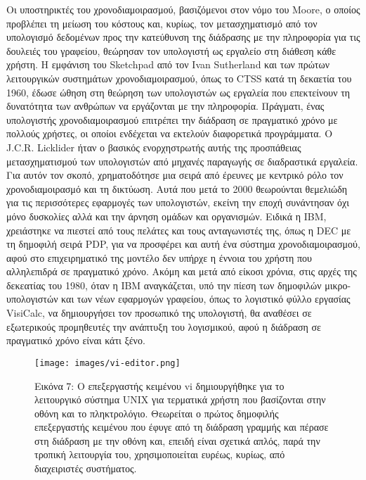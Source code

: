 \documentclass[
]{article}
\begin{document}
Οι υποστηρικτές του χρονοδιαμοιρασμού, βασιζόμενοι στον νόμο του Moore,
ο οποίος προβλέπει τη μείωση του κόστους και, κυρίως, τον μετασχηματισμό
από τον υπολογισμό δεδομένων προς την κατεύθυνση της διάδρασης με την
πληροφορία για τις δουλειές του γραφείου, θεώρησαν τον υπολογιστή ως
εργαλείο στη διάθεση κάθε χρήστη. Η εμφάνιση του Sketchpad από τον Ivan
Sutherland και των πρώτων λειτουργικών συστημάτων χρονοδιαμοιρασμού,
όπως το CTSS κατά τη δεκαετία του 1960, έδωσε ώθηση στη θεώρηση των
υπολογιστών ως εργαλεία που επεκτείνουν τη δυνατότητα των ανθρώπων να
εργάζονται με την πληροφορία. Πράγματι, ένας υπολογιστής
χρονοδιαμοιρασμού επιτρέπει την διάδραση σε πραγματικό χρόνο με πολλούς
χρήστες, οι οποίοι ενδέχεται να εκτελούν διαφορετικά προγράμματα. Ο
J.C.R. Licklider ήταν ο βασικός ενορχηστρωτής αυτής της προσπάθειας
μετασχηματισμού των υπολογιστών από μηχανές παραγωγής σε διαδραστικά
εργαλεία. Για αυτόν τον σκοπό, χρηματοδότησε μια σειρά από έρευνες με
κεντρικό ρόλο τον χρονοδιαμοιρασμό και τη δικτύωση. Αυτά που μετά το
2000 θεωρούνται θεμελιώδη για τις περισσότερες εφαρμογές των
υπολογιστών, εκείνη την εποχή συνάντησαν όχι μόνο δυσκολίες αλλά και την
άρνηση ομάδων και οργανισμών. Ειδικά η IBM, χρειάστηκε να πιεστεί από
τους πελάτες και τους ανταγωνιστές της, όπως η DEC με τη δημοφιλή σειρά
PDP, για να προσφέρει και αυτή ένα σύστημα χρονοδιαμοιρασμού, αφού στο
επιχειρηματικό της μοντέλο δεν υπήρχε η έννοια του χρήστη που
αλληλεπιδρά σε πραγματικό χρόνο. Ακόμη και μετά από είκοσι χρόνια, στις
αρχές της δεκεατίας του 1980, όταν η ΙΒΜ αναγκάζεται, υπό την πίεση των
δημοφιλών μικρο-υπολογιστών και των νέων εφαρμογών γραφείου, όπως το
λογιστικό φύλλο εργασίας VisiCalc, να δημιουργήσει τον προσωπικό της
υπολογιστή, θα αναθέσει σε εξωτερικούς προμηθευτές την ανάπτυξη του
λογισμικού, αφού η διάδραση σε πραγματικό χρόνο είναι κάτι ξένο.

\leavevmode{}%
\begin{figure}
\hypertarget{fig:vi-editor}{%
\centering
\texttt{[image: images/vi-editor.png]}
\caption{Εικόνα 7: Ο επεξεργαστής κειμένου vi δημιουργήθηκε για το
λειτουργικό σύστημα UNIX για τερματικά χρήστη που βασίζονται στην οθόνη
και το πληκτρολόγιο. Θεωρείται ο πρώτος δημοφιλής επεξεργαστής κειμένου
που έφυγε από τη διάδραση γραμμής και πέρασε στη διάδραση με την οθόνη
και, επειδή είναι σχετικά απλός, παρά την τροπική λειτουργία του,
χρησιμοποιείται ευρέως, κυρίως, από διαχειριστές
συστήματος.}\label{fig:vi-editor}
}
\end{figure}
\end{document}
